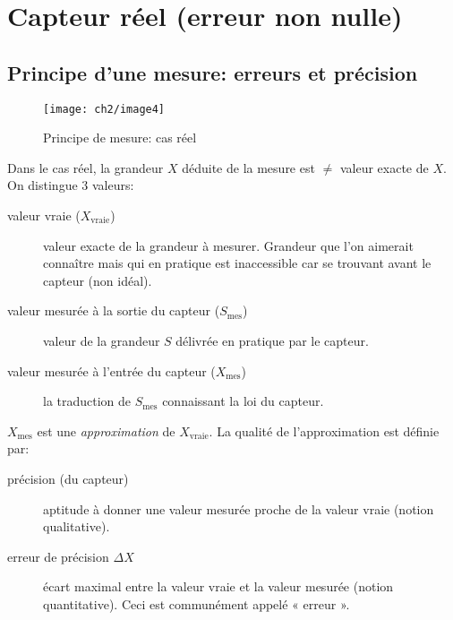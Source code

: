 \section{Capteur réel (erreur non nulle)}
\subsection{Principe d'une mesure: erreurs et précision}
\begin{figure}[H] 
	\centering 
	\texttt{[image: ch2/image4]}
	\caption{Principe de mesure: cas réel} 
\end{figure}
Dans le cas réel, la grandeur \(X\) déduite de la mesure est \(\neq\) valeur exacte de \(X\). On distingue 3 valeurs:
\begin{description}
	\item[valeur vraie (\(X_{\text{vraie}}\))] valeur exacte de la grandeur à mesurer. Grandeur que l'on aimerait connaître mais qui en pratique est inaccessible car se trouvant avant le capteur (non idéal).
	\item[valeur mesurée à la sortie du capteur (\(S_{\text{mes}}\))] valeur de la grandeur \(S\) délivrée en pratique par le capteur.
	\item[valeur mesurée à l'entrée du capteur (\(X_{\text{mes}}\))] la traduction de \(S_{\text{mes}}\) connaissant la loi du capteur.
\end{description} 
\(X_{\text{mes}}\) est une \emph{approximation} de \(X_{\text{vraie}}\). La qualité de l'approximation est définie par:
\begin{description}
	\item[précision (du capteur)] aptitude à donner une valeur mesurée proche de la valeur vraie (notion qualitative).
	\item[erreur de précision \(\Delta X\)] écart maximal entre la valeur vraie et la valeur mesurée (notion quantitative). Ceci est communément appelé « erreur ».
\end{description}
